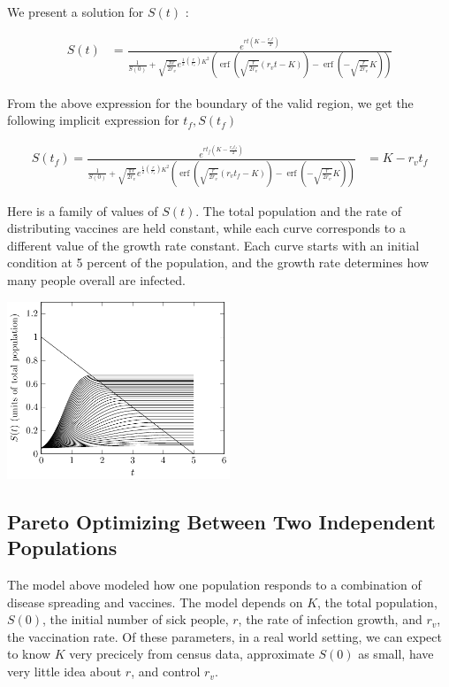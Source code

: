 \documentclass{article}
\DeclareMathOperator\erf{erf}
\begin{document}
We present a solution for $S(t)$ \cite{walph}:

\begin{align}
S(t) & = 
	\frac{e^{ r t (K - \frac{ r_v t}{2})}}
	{\frac{1}{S(0)} + \sqrt{\frac{\pi r}{2 r_v}}
		e^{\frac12 \left( \frac{r}{r_v} \right) K^2}
		\left(\erf\left(  \sqrt{\frac{r}{2 r_v}} (r_v t - K ) \right)
			- \erf\left( - \sqrt{\frac{r}{2 r_v}} K \right) \right)}
\end{align}

From the above expression for the boundary of the valid region,
	we get the following implicit expression for $t_f, S(t_f)$

\begin{align}
S(t_f) = 
	\frac{e^{ r t_f (K - \frac{ r_v t_f }{2})}}
	{\frac{1}{S(0)} + \sqrt{\frac{\pi r}{2 r_v}}
		e^{\frac12 \left( \frac{r}{r_v} \right) K^2}
		\left(\erf\left(  \sqrt{\frac{r}{2 r_v}} (r_v t_f - K ) \right)
			- \erf\left( - \sqrt{\frac{r}{2 r_v}} K \right) \right)}
	& = K - r_v t_f 
\end{align}

Here is a family of values of $S(t)$.
The total population and the rate of distributing vaccines are
	held constant, while each curve corresponds to a different
	value of the growth rate constant.
Each curve starts with an initial condition at 5 percent of the
	population, and the growth rate determines how many people
	overall are infected.

\includegraphics[width=0.5\textwidth]{figures/vaccination-model-curves-varying-s.pdf}


\subsection{Pareto Optimizing Between Two Independent Populations}

The model above modeled how one population responds to a combination
	of disease spreading and vaccines.
The model depends on $K$, the total population, $S(0)$, the initial
	number of sick people, $r$, the rate of infection growth, 
	and $r_v$, the vaccination rate.
Of these parameters, in a real world setting, we can expect to know $K$
	very precicely from census data, approximate $S(0)$ as small,
	have very little idea about $r$, and control $r_v$.
\end{document}
